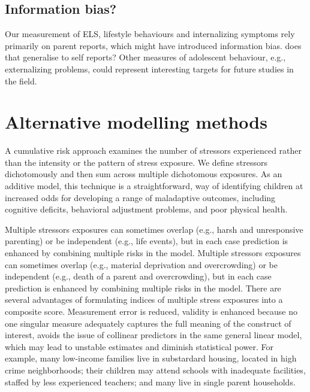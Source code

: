 \documentclass[
  letterpaper,
  DIV=11,
  numbers=noendperiod]{scrreport}
\begin{document}
\subsection{Information bias?}\label{information-bias}

Our measurement of ELS, lifestyle behaviours and internalizing symptoms
rely primarily on parent reports, which might have introduced
information bias. does that generalise to self reports? Other measures
of adolescent behaviour, e.g., externalizing problems, could represent
interesting targets for future studies in the field.

\section{Alternative modelling
methods}\label{alternative-modelling-methods}

A cumulative risk approach examines the number of stressors experienced
rather than the intensity or the pattern of stress exposure. We define
stressors dichotomously and then sum across multiple dichotomous
exposures. As an additive model, this technique is a straightforward,
way of identifying children at increased odds for developing a range of
maladaptive outcomes, including cognitive deficits, behavioral
adjustment problems, and poor physical health.

Multiple stressors exposures can sometimes overlap (e.g., harsh and
unresponsive parenting) or be independent (e.g., life events), but in
each case prediction is enhanced by combining multiple risks in the
model. Multiple stressors exposures can sometimes overlap (e.g.,
material deprivation and overcrowding) or be independent (e.g., death of
a parent and overcrowding), but in each case prediction is enhanced by
combining multiple risks in the model. There are several advantages of
formulating indices of multiple stress exposures into a composite score.
Measurement error is reduced, validity is enhanced because no one
singular measure adequately captures the full meaning of the construct
of interest, avoids the issue of collinear predictors in the same
general linear model, which may lead to unstable estimates and diminish
statistical power. For example, many low-income families live in
substardard housing, located in high crime neighborhoods; their children
may attend schools with inadequate facilities, staffed by less
experienced teachers; and many live in single parent households.
\end{document}
